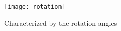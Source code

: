 \begin{figure}
\centering
\texttt{[image: rotation]}
\caption{Characterized by the rotation angles}
\label{rot}
\end{figure}